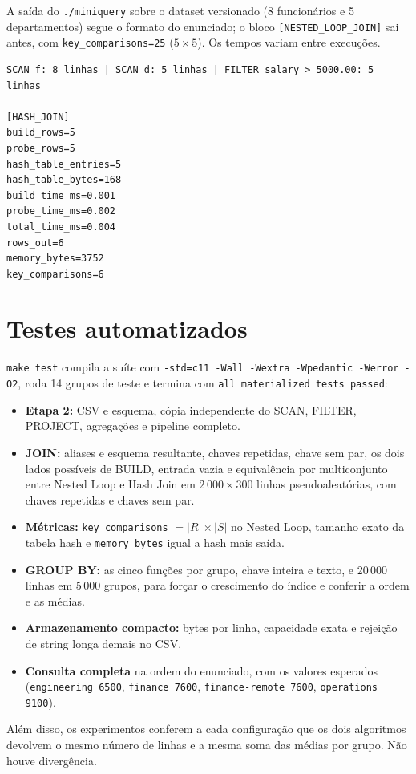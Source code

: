 \documentclass[11pt,a4paper]{article}
\begin{document}
A saída do \texttt{./miniquery} sobre o dataset versionado (8 funcionários e 5 departamentos) segue o formato do enunciado; o bloco \texttt{[NESTED\_LOOP\_JOIN]} sai antes, com \texttt{key\_comparisons=25} ($5 \times 5$). Os tempos variam entre execuções.
\par\medskip\noindent\begin{minipage}{\linewidth}
\begin{lstlisting}
SCAN f: 8 linhas | SCAN d: 5 linhas | FILTER salary > 5000.00: 5 linhas

[HASH_JOIN]
build_rows=5
probe_rows=5
hash_table_entries=5
hash_table_bytes=168
build_time_ms=0.001
probe_time_ms=0.002
total_time_ms=0.004
rows_out=6
memory_bytes=3752
key_comparisons=6
\end{lstlisting}
\end{minipage}\par\medskip

\section{Testes automatizados}\label{sec:testes}
\texttt{make test} compila a suíte com \texttt{-std=c11 -Wall -Wextra -Wpedantic -Werror -O2}, roda 14 grupos de teste e termina com \texttt{all materialized tests passed}:
\begin{itemize}
    \item \textbf{Etapa 2:} CSV e esquema, cópia independente do SCAN, FILTER, PROJECT, agregações e pipeline completo.
    \item \textbf{JOIN:} aliases e esquema resultante, chaves repetidas, chave sem par, os dois lados possíveis de BUILD, entrada vazia e equivalência por multiconjunto entre Nested Loop e Hash Join em $2\,000 \times 300$ linhas pseudoaleatórias, com chaves repetidas e chaves sem par.
    \item \textbf{Métricas:} \texttt{key\_comparisons} $= |R| \times |S|$ no Nested Loop, tamanho exato da tabela hash e \texttt{memory\_bytes} igual a hash mais saída.
    \item \textbf{GROUP BY:} as cinco funções por grupo, chave inteira e texto, e 20\,000 linhas em 5\,000 grupos, para forçar o crescimento do índice e conferir a ordem e as médias.
    \item \textbf{Armazenamento compacto:} bytes por linha, capacidade exata e rejeição de string longa demais no CSV.
    \item \textbf{Consulta completa} na ordem do enunciado, com os valores esperados (\texttt{engineering 6500}, \texttt{finance 7600}, \texttt{finance-remote 7600}, \texttt{operations 9100}).
\end{itemize}
Além disso, os experimentos conferem a cada configuração que os dois algoritmos devolvem o mesmo número de linhas e a mesma soma das médias por grupo. Não houve divergência.
\end{document}
